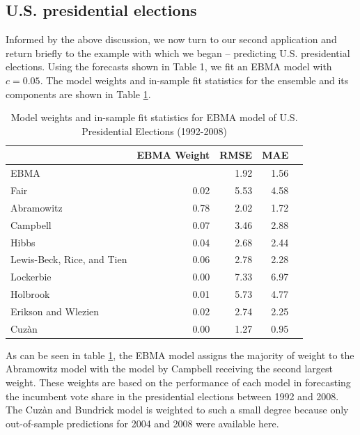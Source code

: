 \documentclass[12pt,fullpage,endnotes]{article}
\begin{document}
\subsection{U.S. presidential elections}

Informed by the above discussion, we now turn to our second
application and return briefly to the example with which we began --
predicting U.S. presidential elections.  Using the forecasts shown in
Table 1, we fit an EBMA model with $c=0.05$.  The model weights and
in-sample fit statistics for the ensemble and its components are shown
in Table \ref{presModel}.


\begin{table}[ht]
\caption{Model weights and in-sample fit statistics for EBMA model of U.S. Presidential Elections (1992-2008)}
\label{presModel}
\begin{center}
\begin{tabular}{lrrrr}
  \toprule
 & EBMA Weight &RMSE &MAE \\ 
  \midrule
EBMA &  & 1.92 & 1.56 \\ 
  Fair & 0.02 & 5.53 & 4.58 \\ 
  Abramowitz & 0.78 & 2.02 & 1.72 \\ 
  Campbell  & 0.07 & 3.46 & 2.88 \\ 
  Hibbs  & 0.04 & 2.68 & 2.44 \\ 
  Lewis-Beck, Rice, and Tien & 0.06 & 2.78 & 2.28 \\ 
  Lockerbie  & 0.00 & 7.33 & 6.97 \\ 
 Holbrook & 0.01 & 5.73 & 4.77 \\ 
  Erikson and Wlezien & 0.02 & 2.74 & 2.25 \\ 
  Cuz\`an & 0.00 & 1.27 & 0.95 \\ 
   \bottomrule
\end{tabular}
\end{center}
\end{table}

As can be seen in table \ref{presModel}, the EBMA model assigns the
majority of weight to the Abramowitz model with the model by Campbell
receiving the second largest weight. These weights are based on the
performance of each model in forecasting the incumbent vote share in
the presidential elections between 1992 and 2008. The Cuz\`an and
Bundrick model is weighted to such a small degree because only
out-of-sample predictions for 2004 and 2008 were available here.
\end{document}
